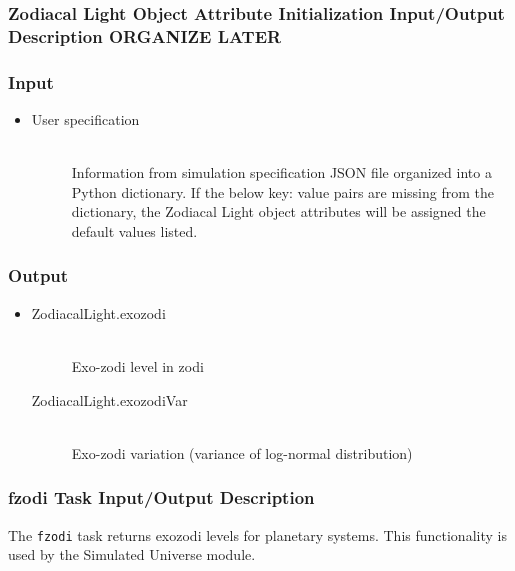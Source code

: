 \documentclass[cleanfoot]{asme2ej}
\begin{document}
\subsubsection{Zodiacal Light Object Attribute Initialization Input/Output Description ORGANIZE LATER}
\subsubsection*{Input}
\begin{itemize}
    \item
    \begin{description}
        \item[User specification] \hfill \\
        Information from simulation specification JSON file organized into a Python dictionary. If the below key: value pairs are missing from the dictionary, the Zodiacal Light object attributes will be assigned the default values listed.
    \end{description}
\end{itemize}

\subsubsection*{Output}
\begin{itemize}
    \item 
    \begin{description}
        \item[ZodiacalLight.exozodi] \hfill \\
        Exo-zodi level in zodi
        \item[ZodiacalLight.exozodiVar] \hfill \\
        Exo-zodi variation (variance of log-normal distribution)
    \end{description}
\end{itemize}

\subsubsection{fzodi Task Input/Output Description} \label{sec:fzoditask}
The \verb+fzodi+ task returns exozodi levels for planetary systems.  This functionality is used by the Simulated Universe module.
\end{document}
